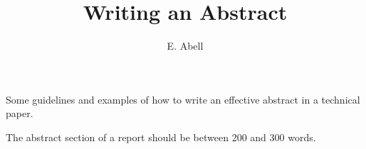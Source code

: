\documentclass{article}
\title{Writing an Abstract}
\author{E. Abell}
\begin{document}
\maketitle

Some guidelines and examples of how to write an effective abstract in
a technical paper.

The abstract section of a report should be between 200 and 300 words.
\end{document}
